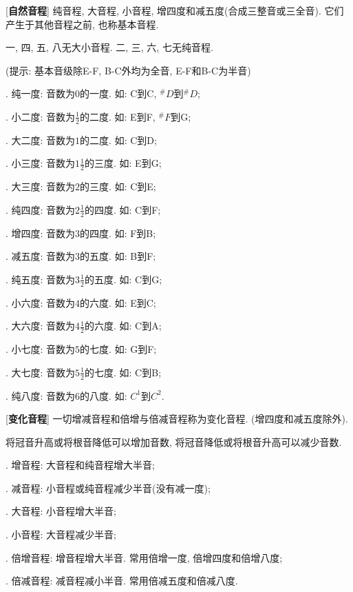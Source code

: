 [\textbf{自然音程}] 纯音程, 大音程, 小音程, 增四度和减五度(合成三整音或三全音). 它们产生于其他音程之前, 也称基本音程.\par
\qquad 一, 四, 五, 八无大小音程. 二, 三, 六, 七无纯音程.\par
\qquad (提示: 基本音级除E-F, B-C外均为全音, E-F和B-C为半音)\par
{}. 纯一度: 音数为$0$的一度. 如: C到C, $^\#D$到$^\#D$;\par
{}. 小二度: 音数为$\frac{1}{2}$的二度. 如: E到F, $^\#F$到G;\par
{}. 大二度: 音数为$1$的二度. 如: C到D;\par
\clearpage
{}. 小三度: 音数为$1\frac{1}{2}$的三度. 如: E到G;\par
{}. 大三度: 音数为$2$的三度. 如: C到E;\par
{}. 纯四度: 音数为$2\frac{1}{2}$的四度. 如: C到F;\par
{}. 增四度: 音数为$3$的四度. 如: F到B;\par
{}. 减五度: 音数为$3$的五度. 如: B到F;\par
{}. 纯五度: 音数为$3\frac{1}{2}$的五度. 如: C到G;\par
{}. 小六度: 音数为$4$的六度. 如: E到C;\par
{}. 大六度: 音数为$4\frac{1}{2}$的六度. 如: C到A;\par
{}. 小七度: 音数为$5$的七度. 如: G到F;\par
{}. 大七度: 音数为$5\frac{1}{2}$的七度. 如: C到B;\par
{}. 纯八度: 音数为$6$的八度. 如: $C^1$到$C^2$.\par

[\textbf{变化音程}] 一切增减音程和倍增与倍减音程称为变化音程. (增四度和减五度除外).\par
\qquad 将冠音升高或将根音降低可以增加音数, 将冠音降低或将根音升高可以减少音数.\par
{}. 增音程: 大音程和纯音程增大半音;\par
{}. 减音程: 小音程或纯音程减少半音(没有减一度);\par
{}. 大音程: 小音程增大半音;\par
{}. 小音程: 大音程减少半音;\par
{}. 倍增音程: 增音程增大半音. 常用倍增一度, 倍增四度和倍增八度;\par
{}. 倍减音程: 减音程减小半音. 常用倍减五度和倍减八度.\par

